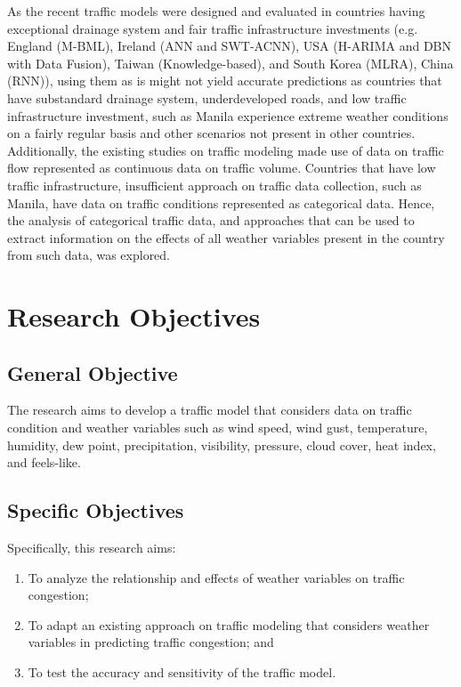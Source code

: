 As the recent traffic models were designed and evaluated in countries having exceptional drainage system and fair traffic infrastructure investments (e.g. England (M-BML), Ireland (ANN and SWT-ACNN), USA (H-ARIMA and DBN with Data Fusion), Taiwan (Knowledge-based), and South Korea (MLRA), China (RNN)), using them as is might not yield accurate predictions as countries that have substandard drainage system, underdeveloped roads, and low traffic infrastructure investment, such as Manila experience extreme weather conditions on a fairly regular basis and other scenarios not present in other countries. Additionally, the existing studies on traffic modeling made use of data on traffic flow represented as continuous data on traffic volume. Countries that have low traffic infrastructure, insufficient approach on traffic data collection, such as Manila, have data on traffic conditions represented as categorical data. Hence, the analysis of categorical traffic data, and approaches that can be used to extract information on the effects of all weather variables present in the country from such data, was explored.



\section{Research Objectives}
\label{sec:researchobjectives}

\subsection{General Objective}
\label{sec:generalobjective}

The research aims to develop a traffic model that considers data on traffic condition and weather variables such as wind speed, wind gust, temperature, humidity, dew point, precipitation, visibility, pressure, cloud cover, heat index, and feels-like.


\subsection{Specific Objectives}
\label{sec:specificobjectives}
Specifically, this research aims:
\begin{enumerate}
    \item To analyze the relationship and effects of weather variables on traffic congestion;
    \item To adapt an existing approach on traffic modeling that considers weather variables in predicting traffic congestion; and
    \item To test the accuracy and sensitivity of the traffic model.
\end{enumerate}


